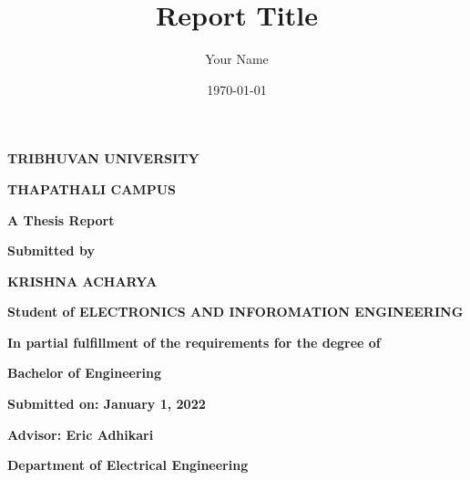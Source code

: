 \documentclass{report}
\begin{document}
\title{Report Title}
\author{Your Name}
\date{\today}




\begin{titlepage}

    \centering
    
    {\Large \bfseries TRIBHUVAN UNIVERSITY}
    
    \vspace{1cm}
    
    {\Large \bfseries THAPATHALI CAMPUS}
    
    \vspace{2cm}
    
    {\Huge \bfseries A Thesis Report}
    
    \vspace{1cm}
    
    {\Large \bfseries Submitted by}
    
    \vspace{1cm}
    
    {\Large \bfseries KRISHNA ACHARYA}
    
    {\large \bfseries Student of ELECTRONICS AND INFOROMATION ENGINEERING}
    
    \vspace{1cm}
    
    {\large \bfseries In partial fulfillment of the requirements for the degree of}
    
    {\large \bfseries Bachelor of Engineering}
    
    \vspace{1cm}
    
    {\large \bfseries Submitted on: January 1, 2022}
    
    \vspace{1cm}
    
    {\large \bfseries Advisor: Eric Adhikari}
    
    {\large \bfseries Department of Electrical Engineering}
    
    \end{titlepage}
    



\maketitle



\begin{abstract}
\end{abstract}

\tableofcontents

\listoffigures
\listoftables






\appendix


%
%
\end{document}
